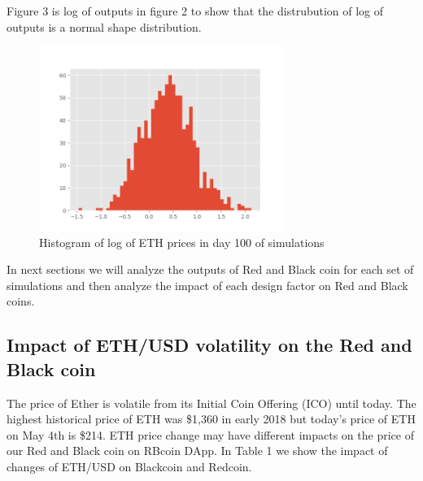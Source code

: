 Figure 3 is log of outputs in figure 2 to show that the distrubution of log of outputs is a normal shape distribution.

\begin{figure} [H]
\centering
\includegraphics[width=8cm]{normaloutpts}
\caption{Histogram of log of ETH prices in day 100 of simulations}
\end{figure}


In next sections we will analyze the outputs of Red and Black coin for each set of simulations and then analyze the impact of each design factor on Red and Black coins.

\subsection{Impact of ETH/USD volatility on the Red and Black coin}

The price of Ether is volatile from its Initial Coin Offering (ICO) until today. The highest historical price of ETH was \$1,360 in early 2018 but today's price of ETH on May 4th is \$214. 
ETH price change may have different impacts on the price of our Red and Black coin on RBcoin DApp. In Table 1 we show the impact of changes of ETH/USD on Blackcoin and Redcoin.



